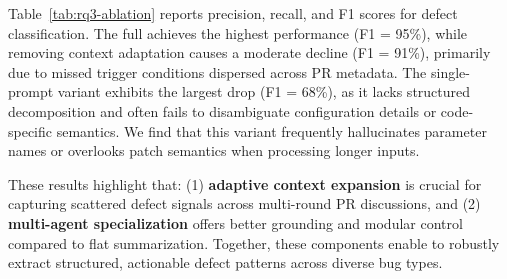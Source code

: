 

Table~\ref{tab:rq3-ablation} reports precision, recall, and F1 scores for defect classification. 
The full \appname achieves the highest performance (F1 = 95\%), while removing context adaptation causes a moderate decline (F1 = 91\%), primarily due to missed trigger conditions dispersed across PR metadata.
The single-prompt variant exhibits the largest drop (F1 = 68\%), as it lacks structured decomposition and often fails to disambiguate configuration details or code-specific semantics.
We find that this variant frequently hallucinates parameter names or overlooks patch semantics when processing longer inputs.

These results highlight that: (1) \textbf{adaptive context expansion} is crucial for capturing scattered defect signals across multi-round PR discussions, and (2) \textbf{multi-agent specialization} offers better grounding and modular control compared to flat summarization.
Together, these components enable \appname to robustly extract structured, actionable defect patterns across diverse bug types.

